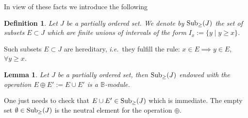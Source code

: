 \documentclass[noams,lp]{compositio}
\newtheorem{defn}[thm]{Definition} %
\newtheorem{lem}[thm]{Lemma}
\def\B{{\mathbb B}}
\def\sub{{\rm Sub}_\geq}
\newcommand{\ie}{{\it i.e.\/}\ }
\begin{document}
In view of these facts we introduce the following

\begin{defn} Let $J$ be a partially ordered set. We denote by $\sub(J)$ the set of subsets $E\subset J$ which are finite unions of intervals of the form $I_x:=\{y\mid y\geq x\}$.
\end{defn}

Such subsets $E\subset J$ are  hereditary, \ie they fulfill the rule:  $x\in E\implies y\in E$, $\forall y\geq x$.

\begin{lem} \label{assoc1} Let $J$ be a partially ordered set, then $\sub(J)$ endowed with the operation $E \oplus E':=E\cup E'$ is a $\B$-module.
\end{lem}
\proof One just needs to check that $E\cup E'\in \sub(J)$ which is immediate. The empty set $\emptyset \in \sub(J)$ is the neutral element for the operation $\oplus$. \endproof
\end{document}
